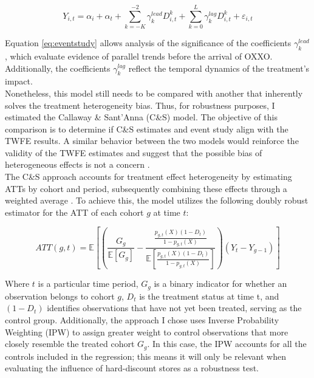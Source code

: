 \documentclass[12pt]{article}
\begin{document}
\begin{equation}
Y_{i,t} = \alpha_i + \alpha_t 
+ \sum_{k=-K}^{-2} \gamma^{lead}_k D^k_{i,t} 
+ \sum_{k=0}^{L} \gamma^{lag}_k D^k_{i,t} 
+ \varepsilon_{i,t}
\label{eq:eventstudy}
\end{equation}

Equation \eqref{eq:eventstudy} allows analysis of the significance of the coefficients  $\gamma^{lead}_k$, which evaluate evidence of parallel trends before the arrival of OXXO. Additionally, the coefficients $\gamma^{lag}_k$ reflect the temporal dynamics of the treatment’s impact.\\

Nonetheless, this model still needs to be compared with another that inherently solves the treatment heterogeneity bias. Thus, for robustness purposes, I estimated the Callaway \& Sant’Anna (C\&S) model. The objective of this comparison is to determine if C\&S estimates and event study align with the TWFE results. A similar behavior between the two models would reinforce the validity of the TWFE estimates and suggest that the possible bias of heterogeneous effects is not a concern
\parencite{RiosAvila_Callaway_SantAnna_2021_csdid_slides,Callaway_SantAnna_2021}.\\

The C\&S approach accounts for treatment effect heterogeneity by estimating ATTs by cohort and period, subsequently combining these effects through a weighted average \parencite{RiosAvila_Callaway_SantAnna_2021_csdid_slides,Callaway_SantAnna_2021}. To achieve this, the model utilizes the following doubly robust estimator for the ATT of each cohort $g$ at time $t$:

\begin{equation}
\label{eq:cs}
ATT(g, t) = \mathbb{E} \left[ \left( \frac{G_g}{\mathbb{E}[G_g]} - \frac{\frac{p_{g,t}(X)(1 - D_t)}{1 - p_{g,t}(X)}}{\mathbb{E} \left[ \frac{p_{g,t}(X)(1 - D_t)}{1 - p_{g,t}(X)} \right]} \right) (Y_t - Y_{g-1}) \right]
\end{equation}

Where $t$ is a particular time period, $ G_g$ is a binary indicator for whether an observation belongs to cohort $g$, $ D_t $ is the treatment status at time t, and  $(1 - D_t)$ identifies observations that have not yet been treated, serving as the control group. Additionally, the approach I chose uses Inverse Probability Weighting (IPW) to assign greater weight to control observations that more closely resemble the treated cohort $G_g$. In this case, the IPW accounts for all the controls included in the regression; this means it will only be relevant when evaluating the influence of hard-discount stores as a robustness test.\\
\end{document}
